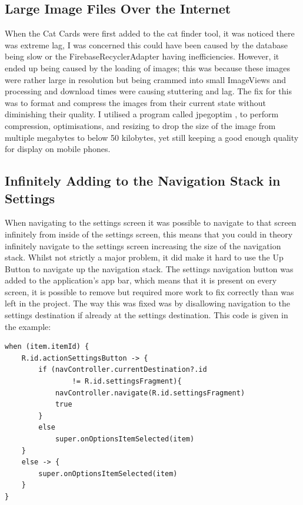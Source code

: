     \subsection{Large Image Files Over the Internet}
    
    When the Cat \gls{Card}s were first added to the cat finder tool, it was noticed there was extreme lag, I was concerned this could have been caused by the database being slow or the FirebaseRecyclerAdapter having inefficiencies. However, it ended up being caused by the loading of images; this was because these images were rather large in resolution but being crammed into small ImageViews and processing and download times were causing stuttering and lag. The fix for this was to format and compress the images from their current state without diminishing their quality. I utilised a program called jpegoptim \cite{JPEGOPTIM}, to perform compression, optimisations, and resizing to drop the size of the image from multiple megabytes to below 50 kilobytes, yet still keeping a good enough quality for display on mobile phones.
    
    \subsection{Infinitely Adding to the Navigation Stack in Settings}
    When navigating to the settings screen it was possible to navigate to that screen infinitely from inside of the settings screen, this means that you could in theory infinitely navigate to the settings screen increasing the size of the navigation stack. Whilst not strictly a major problem, it did make it hard to use the \gls{Up Button} to navigate up the navigation stack. The settings navigation button was added to the application's app bar, which means that it is present on every screen, it is possible to remove but required more work to fix correctly than was left in the project. The way this was fixed was by disallowing navigation to the settings destination if already at the settings destination. This code is given in the example:
    
\begin{verbatim}
when (item.itemId) {
    R.id.actionSettingsButton -> {
        if (navController.currentDestination?.id 
                != R.id.settingsFragment){
            navController.navigate(R.id.settingsFragment)
            true
        }
        else
            super.onOptionsItemSelected(item)
    }
    else -> {
        super.onOptionsItemSelected(item)
    }
}
\end{verbatim}
